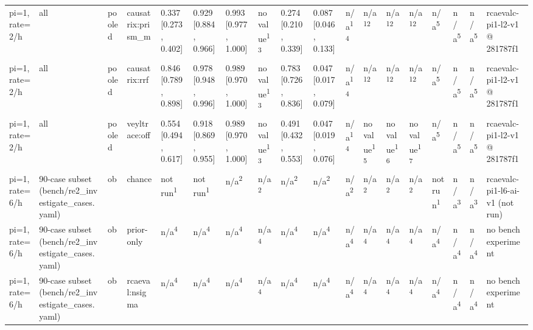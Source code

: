 \begin{table}[t]
\begin{tabular}{llllllllllllllllll}
pi=1, rate=2/h & all & pooled & causatrix:prism\_m & 0.337 [0.273, 0.402] & 0.929 [0.884, 0.966] & 0.993 [0.977, 1.000] & no value\textsuperscript{13} & 0.274 [0.210, 0.339] & 0.087 [0.046, 0.133] & n/a\textsuperscript{14} & n/a\textsuperscript{12} & n/a\textsuperscript{12} & n/a\textsuperscript{12} & n/a\textsuperscript{5} & n/a\textsuperscript{5} & n/a\textsuperscript{5} & rcaevalc-pi1-l2-v1 @ 281787f1 \\
pi=1, rate=2/h & all & pooled & causatrix:rrf & 0.846 [0.789, 0.898] & 0.978 [0.948, 0.996] & 0.989 [0.970, 1.000] & no value\textsuperscript{13} & 0.783 [0.726, 0.836] & 0.047 [0.017, 0.079] & n/a\textsuperscript{14} & n/a\textsuperscript{12} & n/a\textsuperscript{12} & n/a\textsuperscript{12} & n/a\textsuperscript{5} & n/a\textsuperscript{5} & n/a\textsuperscript{5} & rcaevalc-pi1-l2-v1 @ 281787f1 \\
pi=1, rate=2/h & all & pooled & veyltrace:off & 0.554 [0.494, 0.617] & 0.918 [0.869, 0.955] & 0.989 [0.970, 1.000] & no value\textsuperscript{13} & 0.491 [0.432, 0.553] & 0.047 [0.019, 0.076] & n/a\textsuperscript{14} & no value\textsuperscript{15} & no value\textsuperscript{16} & no value\textsuperscript{17} & n/a\textsuperscript{5} & n/a\textsuperscript{5} & n/a\textsuperscript{5} & rcaevalc-pi1-l2-v1 @ 281787f1 \\
pi=1, rate=6/h & 90-case subset (bench/re2\_investigate\_cases.yaml) & ob & chance & not run\textsuperscript{1} & not run\textsuperscript{1} & n/a\textsuperscript{2} & n/a\textsuperscript{2} & n/a\textsuperscript{2} & n/a\textsuperscript{2} & n/a\textsuperscript{2} & n/a\textsuperscript{2} & n/a\textsuperscript{2} & n/a\textsuperscript{2} & not run\textsuperscript{1} & n/a\textsuperscript{3} & n/a\textsuperscript{3} & rcaevalc-pi1-l6-ai-v1 (not run) \\
pi=1, rate=6/h & 90-case subset (bench/re2\_investigate\_cases.yaml) & ob & prior-only & n/a\textsuperscript{4} & n/a\textsuperscript{4} & n/a\textsuperscript{4} & n/a\textsuperscript{4} & n/a\textsuperscript{4} & n/a\textsuperscript{4} & n/a\textsuperscript{4} & n/a\textsuperscript{4} & n/a\textsuperscript{4} & n/a\textsuperscript{4} & n/a\textsuperscript{4} & n/a\textsuperscript{4} & n/a\textsuperscript{4} & no bench experiment \\
pi=1, rate=6/h & 90-case subset (bench/re2\_investigate\_cases.yaml) & ob & rcaeval:nsigma & n/a\textsuperscript{4} & n/a\textsuperscript{4} & n/a\textsuperscript{4} & n/a\textsuperscript{4} & n/a\textsuperscript{4} & n/a\textsuperscript{4} & n/a\textsuperscript{4} & n/a\textsuperscript{4} & n/a\textsuperscript{4} & n/a\textsuperscript{4} & n/a\textsuperscript{4} & n/a\textsuperscript{4} & n/a\textsuperscript{4} & no bench experiment \\

\end{tabular}
\end{table}
